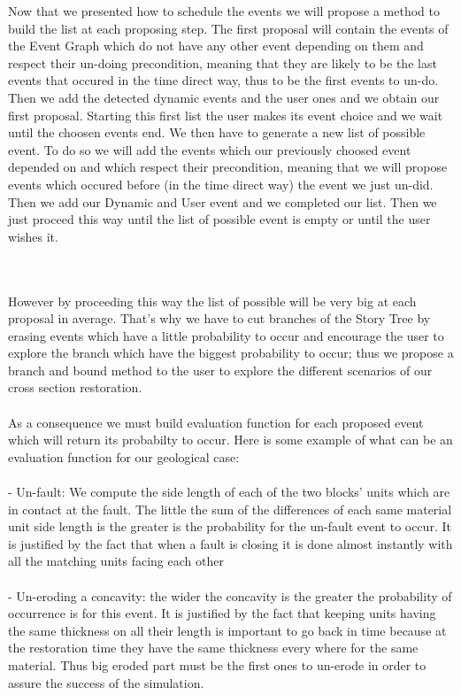 \documentclass[12pt, a4paper]{memoir} %
\begin{document}
Now that we presented how to schedule the events we will propose a method to build the list  at each proposing step. The first proposal will contain the events of the Event Graph which do not have any other event depending on them and respect their un-doing precondition, meaning that they are likely to be the last events that occured in the time direct way, thus to be the first events to un-do. Then we add the detected dynamic events and the user ones and we obtain our first proposal. Starting this first list the user makes its event choice and we wait until the choosen events end. We then have to generate a new list of possible event. To do so we will add the events which our previously choosed event depended on and which respect their precondition, meaning that we will propose events which occured before (in the time direct way) the event we just un-did. Then we add our Dynamic and User event and we completed our list. Then we just proceed this way until the list of possible event is empty or until the user wishes it.\\\\\

However by proceeding this way the list of possible will be very big at each proposal in average. That's why we have to cut branches of the Story Tree by erasing events which have a little probability to occur and encourage the user to explore the branch which have the biggest probability to occur; thus we propose a branch and bound method to the user to explore the different scenarios of our cross section restoration.\\\\

As a consequence we must build evaluation function for each proposed event which will return its probabilty to occur. Here is some example of what can be an evaluation function for our geological case:\\\\

 - Un-fault: We compute the side length of each of the two blocks' units which are in contact at the fault. The little the sum of the differences of each same material unit side length is the greater is the probability for the un-fault event to occur. It is justified by the fact that when a fault is closing it is done almost instantly with all the matching units facing each other\\\\
 
 - Un-eroding a concavity: the wider the concavity is the greater the probability of occurrence is for this event. It is justified by the fact that keeping units having the same thickness on all their length is important to go back in time because at the restoration time they have the same thickness every where for the same material. Thus big eroded part must be the first ones to un-erode in order to assure the success of the simulation.\\\\
 
\end{document}

